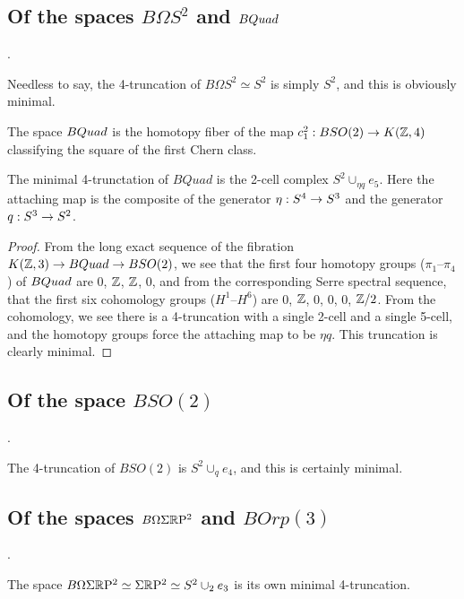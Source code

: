 \documentclass{amsart}
\begin{document}
\subsection{Of the spaces $B\Omega S^2$ and $BQuad$}.

Needless to say, the 4-truncation of $B\Omega S^2 \simeq S^2$ is simply $S^2$, and this is obviously minimal.

\begin{definition}[$BQuad$]
The space $BQuad$ is the homotopy fiber of the map $c_1^2: BSO(2) \rightarrow K(\mathbb Z,4)$ classifying the square of the first Chern class.
\end{definition}


\begin{proposition} 
\label{prop-quadtrunc}
The minimal 4-trunctation of $BQuad$ is the 2-cell complex $S^2 \cup_{\eta q} e_5$.  Here the attaching map is the composite of the generator $\eta: S^4 \rightarrow S^3$ and the generator $q: S^3 \rightarrow S^2$.
\end{proposition}

\begin{proof}
From the long exact sequence of the fibration $K(\mathbb Z,3) \rightarrow BQuad \rightarrow BSO(2)$, we see that the first four homotopy groups ($\pi_1$--$\pi_4$) of $BQuad$ are $0$, $\mathbb Z$, $\mathbb Z$, $0$, and from the corresponding Serre spectral sequence, that the first six cohomology groups ($H^1$--$H^6$) are $0$, $\mathbb Z$, $0$, $0$, $0$, $\mathbb Z/2$.  From the cohomology, we see there is a 4-truncation with a single 2-cell and a single 5-cell, and the homotopy groups force the attaching map to be $\eta q$.  This truncation is clearly minimal.
\end{proof}

\subsection{Of the space $BSO(2)$}.

The 4-truncation of $BSO(2)$ is $S^2 \cup_q e_4$, and this is certainly minimal.

\subsection{Of the spaces $B \Omega \Sigma \mathbb R \mathrm{P}^2$ and $B Orp(3)$}.

The space $B \Omega \Sigma \mathbb R \mathrm{P}^2 \simeq \Sigma \mathbb R \mathrm{P}^2 \simeq S^2 \cup_2 e_3$ is its own minimal 4-truncation.
\end{document}
